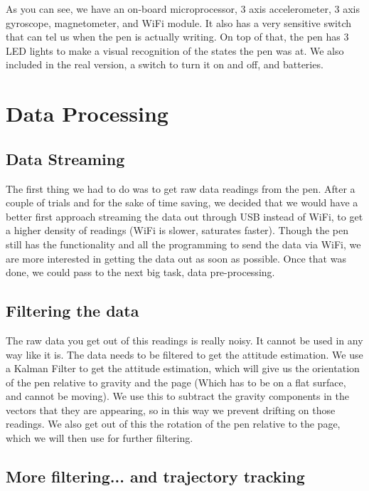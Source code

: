 \documentclass{article}
\begin{document}
As you can see, we have an on-board microprocessor, 3 axis accelerometer, 3 axis gyroscope, magnetometer, and WiFi module. It also has a very sensitive switch that can tel us when the pen is actually writing. On top of that, the pen has 3 LED lights to make a visual recognition of the states the pen was at. We also included in the real version, a switch to turn it on and off, and batteries.

\section{Data Processing} 

\subsection{Data Streaming}
 
The first thing we had to do was to get raw data readings from the pen. After a couple of trials and for the sake of time saving, we decided that we would have a better first approach streaming the data out through USB instead of WiFi, to get a higher density of readings (WiFi is slower, saturates faster). Though the pen still has the functionality and all the programming to send the data via WiFi, we are more interested in getting the data out as soon as possible. Once that was done, we could pass to the next big task, data pre-processing.

\subsection{Filtering the data}

The raw data you get out of this readings is really noisy. It cannot be used in any way like it is. The data needs to be filtered to get the attitude estimation. We use a Kalman Filter to get the attitude estimation, which will give us the orientation of the pen relative to gravity and the page (Which has to be on a flat surface, and cannot be moving).
We use this to subtract the gravity components in the vectors that they are appearing, so in this way we prevent drifting on those readings. We also get out of this the rotation of the pen relative to the page, which we will then use for further filtering.

\subsection{More filtering... and trajectory tracking}
\end{document}
